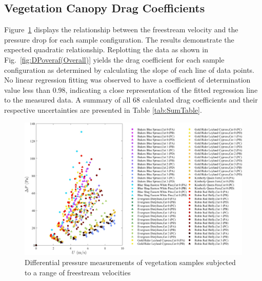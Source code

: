\documentclass[12pt]{article}
\begin{document}
\pagebreak


\subsection{Vegetation Canopy Drag Coefficients}
\label{ssec:headingscap}

Figure~\ref{fig:DPvU(Overall)} displays the relationship between the freestream velocity and the pressure drop for each sample configuration. The results demonstrate the expected quadratic relationship. Replotting the data as shown in Fig.~\ref{fig:DPoveraf(Overall)} yields the drag coefficient for each sample configuration as determined by calculating the slope of each line of data points. No linear regression fitting was observed to have a coefficient of determination value less than 0.98, indicating a close representation of the fitted regression line to the measured data. A summary of all 68 calculated drag coefficients and their respective uncertainties are presented in Table \ref{tab:SumTable}.

\begin{figure} [!]
	\centering
	\includegraphics[width=\textwidth,keepaspectratio]{Picture8.jpg}
	\caption[Differential pressure measurements of vegetation samples]{Differential pressure measurements of vegetation samples subjected to a range of freestream velocities}
	\label{fig:DPvU(Overall)}
\end{figure}
\end{document}
